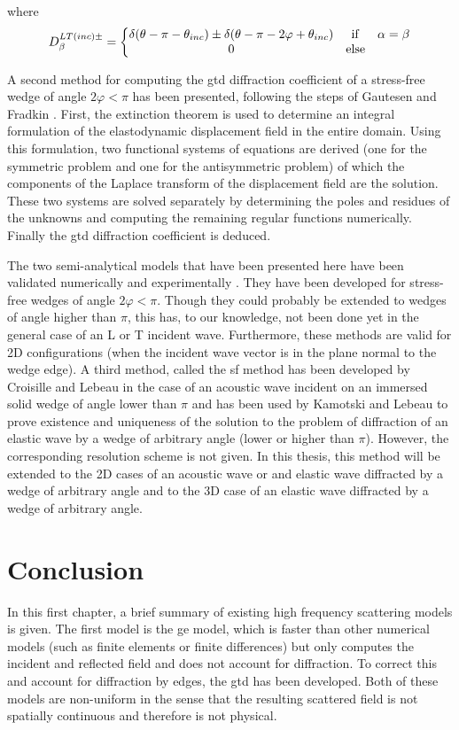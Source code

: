 where
\begin{equation}
D_{\beta}^{LT(inc)\pm}= \left\{
\begin{matrix}
\delta(\theta-\pi-\theta_{inc})\pm\delta(\theta-\pi-2\varphi+\theta_{inc}) & \rm if & \alpha=\beta \\
0 & \rm else
\end{matrix}
\right.
\end{equation}


A second method for computing the \acrshort{gtd} diffraction coefficient of a stress-free wedge of angle $2\varphi<\pi$ has been presented, following the steps of Gautesen and Fradkin \cite{GautesenFradkin}. First, the extinction theorem is used to determine an integral formulation of the elastodynamic displacement field in the entire domain. Using this formulation, two functional systems of equations are derived (one for the symmetric problem and one for the antisymmetric problem) of which the components of the Laplace transform of the displacement field are the solution. These two systems are solved separately by determining the poles and residues of the unknowns and computing the remaining regular functions numerically. Finally the \acrshort{gtd} diffraction coefficient is deduced.

The two semi-analytical models that have been presented here have been validated numerically \cite{GautesenFradkin} and experimentally \cite{ChapmanBurch}. They have been developed for stress-free wedges of angle $2\varphi<\pi$. Though they could probably be extended to wedges of angle higher than $\pi$, this has, to our knowledge, not been done yet in the general case of an L or T incident wave. Furthermore, these methods are valid for 2D configurations (when the incident wave vector is in the plane normal to the wedge edge). A third method, called the \acrfull{sf} method has been developed by Croisille and Lebeau \cite{CroisilleLebeau} in the case of an acoustic wave incident on an immersed solid wedge of angle lower than $\pi$ and has been used by Kamotski and Lebeau \cite{KamotskiLebeau} to prove existence and uniqueness of the solution to the problem of diffraction of an elastic wave by a wedge of arbitrary angle (lower or higher than $\pi$). However, the corresponding resolution scheme is not given. In this thesis, this method will be extended to the 2D cases of an acoustic wave or and elastic wave diffracted by a wedge of arbitrary angle and to the 3D case of an elastic wave diffracted by a wedge of arbitrary angle.

\section*{Conclusion}
In this first chapter, a brief summary of existing high frequency scattering models is given. The first model is the \acrfull{ge} model, which is faster than other numerical models (such as finite elements or finite differences) but only computes the incident and reflected field and does not account for diffraction. To correct this and account for diffraction by edges, the \acrfull{gtd} has been developed. Both of these models are non-uniform in the sense that the resulting scattered field is not spatially continuous and therefore is not physical. 

